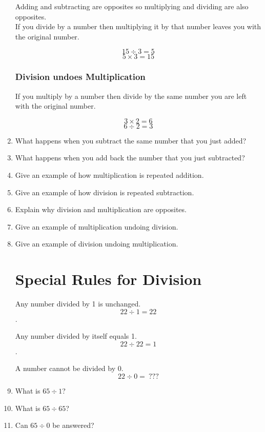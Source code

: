 \documentclass{article}
\begin{document}
\begin{enumerate}
Adding and subtracting are opposites so multiplying and dividing are also opposites.\\

If you divide by a number then multiplying it by that number leaves you with the original number.

$$15 \div 3 = 5$$
$$5 \times 3 = 15$$

\pagebreak

\subsubsection{Division undoes Multiplication}

If you multiply by a number then divide by the same number you are left with the original number.

$$3 \times 2 = 6$$
$$6 \div 2 = 3$$

\item What happens when you subtract the same number that you just added?
\item What happens when you add back the number that you just subtracted?
\item Give an example of how multiplication is repeated addition.
\item Give an example of how division is repeated subtraction.
\item Explain why division and multiplication are opposites.
\item Give an example of multiplication undoing division.
\item Give an example of division undoing multiplication.

\newpage

\section*{Special Rules for Division}
\vspace{16pt}

Any number divided by 1 is unchanged.\\

$$22 \div 1 = 22$$.

Any number divided by itself equals 1.\\

$$22 \div 22 = 1$$.

A number cannot be divided by 0.\\

$$22 \div 0 = \ ???$$

\item What is $65 \div 1$?
\item What is $65 \div 65$?
\item Can $65 \div 0$ be answered?


\end{enumerate}
\end{document}
